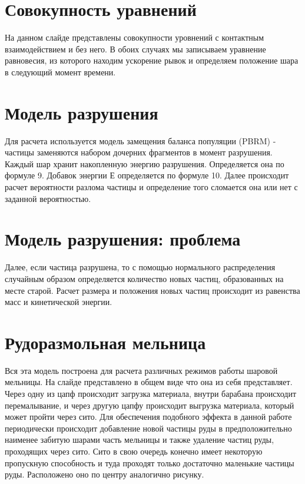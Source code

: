\documentclass[a4paper]{article}
\begin{document}
\section{Совокупность уравнений}

На данном слайде представлены совокупности уровнений с контактным взаимодействием и без него.
В обоих случаях мы записываем уравнение равновесия, из которого находим ускорение рывок и определяем положение шара в следующий момент времени.

\section{Модель разрушения}

Для расчета используется модель замещения баланса популяции (PBRM) - частицы заменяются набором дочерних фрагментов в момент разрушения. 
Каждый шар хранит накопленную энергию разрушения.
Определяется она по формуле 9.
Добавок энергии Е определяется по формуле 10.
Далее происходит расчет вероятности разлома частицы и определение того сломается она или нет с заданной вероятностью.

\section{Модель разрушения: проблема}

Далее, если частица разрушена, то с помощью нормального распределения случайным образом определяется количество новых частиц, образованных на месте старой.
Расчет размера и положения новых частиц происходит из равенства масс и кинетической энергии.


\section{Рудоразмольная мельница}

Вся эта модель построена для расчета различных режимов работы шаровой мельницы.
На слайде представлено в общем виде что она из себя представляет.
Через одну из цапф происходит загрузка материала, внутри барабана происходит перемалывание, и через другую цапфу происходит выгрузка материала, который может пройти через сито.
Для обеспечения подобного эффекта в данной работе периодически происходит добавление новой частицы руды в предположительно наименее забитую шарами часть мельницы и также удаление частиц руды, проходящих через сито.
Сито в свою очередь конечно имеет некоторую пропускную способность и туда проходят только достаточно маленькие частицы руды.
Расположено оно по центру аналогично рисунку.
\end{document}
